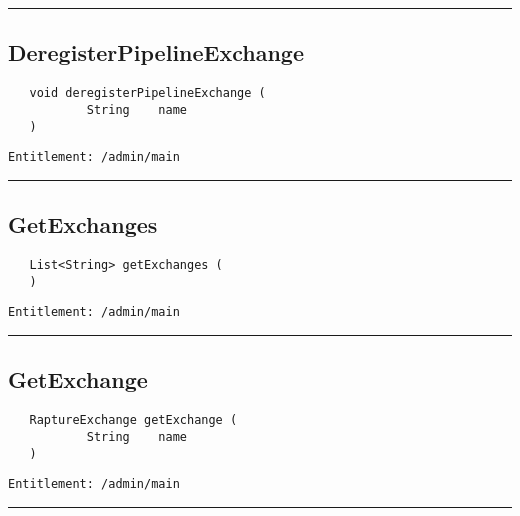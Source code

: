 \rule{12cm}{2pt}
\subsection{DeregisterPipelineExchange}
\label{Api:DeregisterPipelineExchange}
\begin{verbatim}
   void deregisterPipelineExchange (
           String    name
   )
\end{verbatim}
\begin{Verbatim}[fontsize=\small, formatcom=\color{Maroon}]
  Entitlement: /admin/main
\end{Verbatim}



\rule{12cm}{2pt}
\subsection{GetExchanges}
\label{Api:GetExchanges}
\begin{verbatim}
   List<String> getExchanges (
   )
\end{verbatim}
\begin{Verbatim}[fontsize=\small, formatcom=\color{Maroon}]
  Entitlement: /admin/main
\end{Verbatim}



\rule{12cm}{2pt}
\subsection{GetExchange}
\label{Api:GetExchange}
\begin{verbatim}
   RaptureExchange getExchange (
           String    name
   )
\end{verbatim}
\begin{Verbatim}[fontsize=\small, formatcom=\color{Maroon}]
  Entitlement: /admin/main
\end{Verbatim}



\rule{12cm}{2pt}
